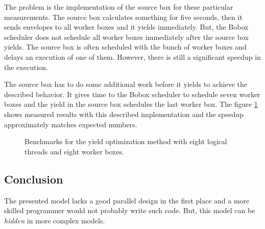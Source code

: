 The problem is the implementation of the source box for these particular measurements. The source box calculates something for five seconds, then it sends envelopes to all worker boxes and it yields immediately. But, the Bobox scheduler does not schedule all worker boxes immediately after the source box yields. The source box is often scheduled with the bunch of worker boxes and delays an execution of one of them. However, there is still a significant speedup in the execution.

The source box has to do some additional work before it yields to achieve the described behavior. It gives time to the Bobox scheduler to schedule seven worker boxes and the yield in the source box schedules the last worker box. The figure \ref{yield-bench-better} shows measured results with this described implementation and the speedup approximately matches expected numbers.

\begin{figure}[h!]
\vspace{.5cm}
\centering
{}
\caption{Benchmarks for the yield optimization method with eight logical threads and eight worker boxes.}
\label{yield-bench-better}
\end{figure}

\subsection{Conclusion}
The presented model lacks a good parallel design in the first place and a more skilled programmer would not probably write such code. But, this model can be \textit{hidden} in more complex models.

